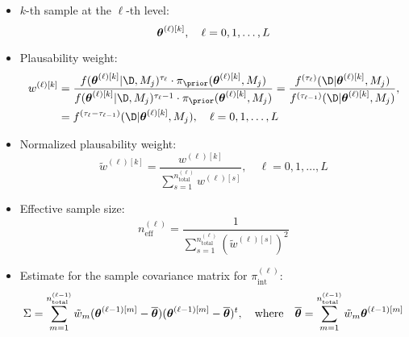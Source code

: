     
\begin{itemize}
 \item $k$-th sample at the $\ell$-th level: 
    \begin{equation}\label{eq:samples}
    \mbox{\boldmath$ \theta $}^{(\ell) [k]},   \quad \ell=0,1,\ldots, L \\ 
    \end{equation} 

 \item Plausability weight:
    \begin{equation}
    \begin{split}\label{eq:w}
    w^{(\ell) [k]} &= \dfrac{f(\bv{\theta}^{(\ell) [k]}|\D, M_j)^{\tau_\ell} \cdot \pi_\prior (\bv{\theta}^{(\ell) [k]}, M_j)}{f(\bv{\theta}^{(\ell) [k]}|\D, M_j)^{\tau_\ell-1} \cdot \pi_\prior (\bv{\theta}^{(\ell) [k]}, M_j)}  
		=\dfrac{f^{(\tau_{\ell})}(\D | \bv{\theta}^{(\ell) [k]}, M_j) }{f^{(\tau_{\ell-1})}(\D | \bv{\theta}^{(\ell) [k]}, M_j)}, \\
		&= f^{(\tau_{\ell}-\tau_{\ell-1})}(\D | \bv{\theta}^{(\ell) [k]}, M_j), \quad \ell=0,1,\ldots, L \\ 
    \end{split}
    \end{equation}
    
\item Normalized plausability weight:
    \begin{equation}\label{eq:w-tilde}
    \tilde{w}^{(\ell) [k]} = \dfrac{w^{(\ell) [k]}}{\sum_{s=1}^{n_\text{total}^{(\ell)}}  w^{(\ell) [s]} }, \quad \ell=0,1,\ldots,L 
    \end{equation}

\item Effective sample size:
    \begin{equation}\label{eq:neff}
    n_\text{eff}^{(\ell)} = \dfrac{1}{\sum_{s=1}^{n_\text{total}^{(\ell)}} \left( \tilde{w}^{(\ell) [s]}\right)^2}
    \end{equation}
    
\item Estimate for the sample covariance matrix for $\pi_\text{int}^{(\ell)}$:
    \begin{equation}\label{eq:est_cov}
     \Sigma = \sum_{m=1}^{n_\text{total}^{(\ell-1)}} \tilde{w}_{m} (\mbox{\boldmath$ \theta $}^{(\ell-1) [m]} - \overline{\mbox{\boldmath$ \theta $}}) (\mbox{\boldmath$ \theta $}^{(\ell-1) [m]} - \overline{\mbox{\boldmath$ \theta $}})^{t}, \quad \text{where} \quad
     \overline{\mbox{\boldmath$ \theta $}} = \sum_{m=1}^{n_\text{total}^{(\ell-1)}}  \tilde{w}_{m} \mbox{\boldmath$ \theta $}^{(\ell-1) [m]}
    \end{equation}

\end{itemize}


